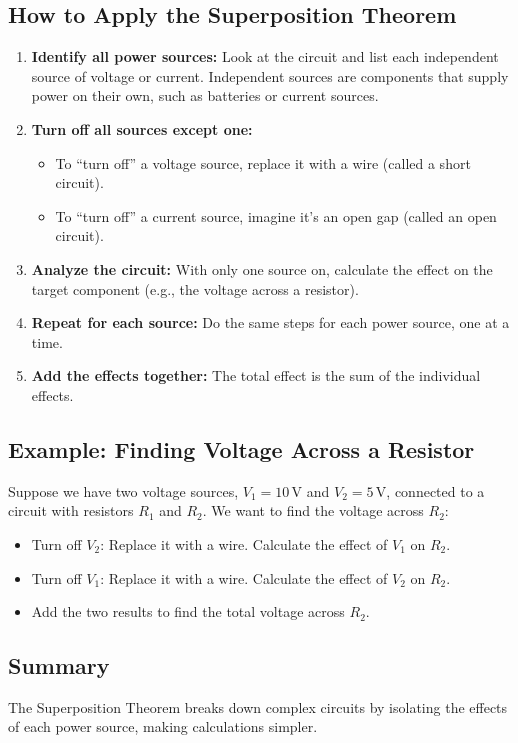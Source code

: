 \documentclass{article}
\begin{document}
\subsection{How to Apply the Superposition Theorem}
\begin{enumerate}
    \item \textbf{Identify all power sources:} Look at the circuit and list each independent source of voltage or current. Independent sources are components that supply power on their own, such as batteries or current sources.
    \item \textbf{Turn off all sources except one:} 
    \begin{itemize}
        \item To “turn off” a voltage source, replace it with a wire (called a short circuit).
        \item To “turn off” a current source, imagine it’s an open gap (called an open circuit).
    \end{itemize}
    \item \textbf{Analyze the circuit:} With only one source on, calculate the effect on the target component (e.g., the voltage across a resistor).
    \item \textbf{Repeat for each source:} Do the same steps for each power source, one at a time.
    \item \textbf{Add the effects together:} The total effect is the sum of the individual effects.
\end{enumerate}

\subsection{Example: Finding Voltage Across a Resistor}
Suppose we have two voltage sources, \( V_1 = 10 \, \text{V} \) and \( V_2 = 5 \, \text{V} \), connected to a circuit with resistors \( R_1 \) and \( R_2 \). We want to find the voltage across \( R_2 \):
\begin{itemize}
    \item Turn off \( V_2 \): Replace it with a wire. Calculate the effect of \( V_1 \) on \( R_2 \).
    \item Turn off \( V_1 \): Replace it with a wire. Calculate the effect of \( V_2 \) on \( R_2 \).
    \item Add the two results to find the total voltage across \( R_2 \).
\end{itemize}

\subsection{Summary}
The Superposition Theorem breaks down complex circuits by isolating the effects of each power source, making calculations simpler.
\end{document}
